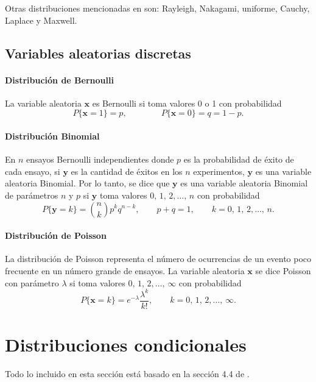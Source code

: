 \documentclass[a4paper]{report}
\newcommand{\x}{\mathbf{x}}
\newcommand{\y}{\mathbf{y}}
\begin{document}
Otras distribuciones mencionadas en \cite{papoulis2002probability} son: Rayleigh, Nakagami, uniforme, Cauchy, Laplace y Maxwell.

\subsection{Variables aleatorias discretas}\label{sec:discrete_random_variables}

\paragraph{Distribución de Bernoulli} 

La variable aleatoria \(\x\) es Bernoulli si toma valores 0 o 1 con probabilidad
\[
 P\{\x=1\}=p,\qquad\qquad P\{\x=0\}=q=1-p.
\]

\paragraph{Distribución Binomial}

En \(n\) ensayos Bernoulli independientes donde \(p\) es la probabilidad de éxito de cada ensayo, si \(\y\) es la cantidad de éxitos en los \(n\) experimentos, \(\y\) es una variable aleatoria Binomial. Por lo tanto, se dice que \(\y\) es una variable aleatoria Binomial de parámetros \(n\) y \(p\) si \(\y\) toma valores \(0,\,1,\,2,\dots,\,n\) con probabilidad
\[
 P\{\y=k\}=\binom{n}{k}p^{k}q^{n-k},\qquad p+q=1,\qquad k=0,\,1,\,2,\dots,\,n.
\]

\paragraph{Distribución de Poisson}

La distribución de Poisson representa el número de ocurrencias de un evento poco frecuente en un número grande de ensayos. La variable aleatoria \(\x\) se dice Poisson con parámetro \(\lambda\) si toma valores \(0,\,1,\,2,\dots,\,\infty\) con probabilidad
\[
 P\{\x=k\}=e^{-\lambda}\frac{\lambda^k}{k!},\qquad k=0,\,1,\,2,\dots,\,\infty.
\]

\section{Distribuciones condicionales}\label{sec:conditional_distributions}

Todo lo incluido en esta sección está basado en la sección 4.4 de \cite{papoulis2002probability}.
\end{document}
